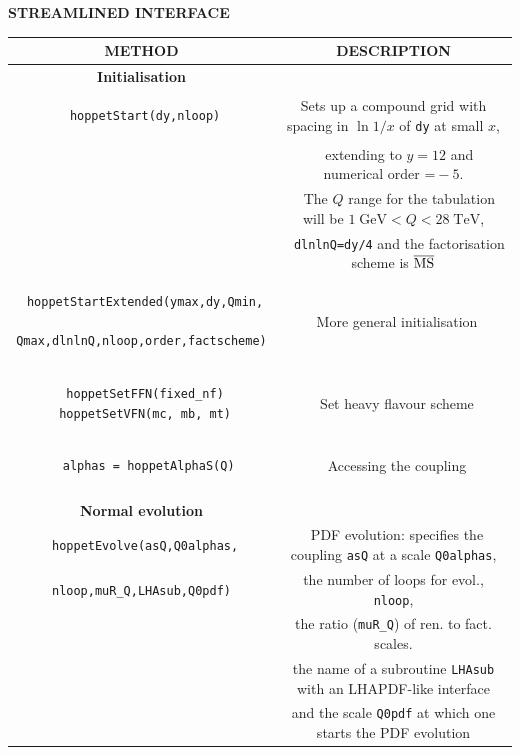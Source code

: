 \documentclass[12pt]{article}
\newcommand{\GeV}{\;\mathrm{GeV}}
\newcommand{\TeV}{\;\mathrm{TeV}}
\newcommand{\ttt}[1]{\texttt{#1}}
\newcommand{\fn}{\scriptsize}
\begin{document}
\begin{table}
\begin{center}
{\bf \large STREAMLINED INTERFACE}
\\
\vspace{0.2cm}
\begin{tabular}{|c|c|}
\hline
\bf METHOD  & \bf DESCRIPTION \\
\hline
\bf Initialisation & \\
\hline
\begin{lstlisting}
 hoppetStart(dy,nloop)
\end{lstlisting} 
& \scriptsize
Sets up a compound grid with
spacing in $\ln 1/x$ of \ttt{dy} at small $x$,\\ &
\fn~  extending to $y = 12$ and numerical
order $\ttt=-5$. \\ & \fn~  The $Q$ range for the tabulation will be $1\GeV <
Q<28 \TeV$, \\
& \fn~ \ttt{dlnlnQ=dy/4} and the factorisation scheme is ${\overline{\rm MS}}$\\
\hline
\begin{lstlisting}
 hoppetStartExtended(ymax,dy,Qmin,
 Qmax,dlnlnQ,nloop,order,factscheme)
\end{lstlisting} & \fn
  ~More general initialisation \\
\hline 
\begin{lstlisting}
 hoppetSetFFN(fixed_nf)
 hoppetSetVFN(mc, mb, mt)
\end{lstlisting} &
\fn ~Set heavy flavour scheme
\\
\hline
\begin{lstlisting}
  alphas = hoppetAlphaS(Q)
\end{lstlisting} &
\fn~Accessing the coupling \\
\hline&\\[-0.5em]
\bf Normal evolution & \\
\hline
\texttt{\footnotesize
 hoppetEvolve(asQ,Q0alphas,}
& \fn\ PDF evolution: specifies the coupling \ttt{asQ} at a 
scale \ttt{Q0alphas}, \\
 \texttt{\footnotesize nloop,muR\_Q,LHAsub,Q0pdf)}&
 \fn the number of loops for  evol., \ttt{nloop}, \\
&\fn the ratio (\ttt{muR\_Q}) of ren. to fact. scales. \\ 
&  \fn the name of a subroutine \ttt{LHAsub} with an LHAPDF-like interface \\
&  \fn and the scale
\ttt{Q0pdf} at which one starts the PDF evolution \\

\end{tabular}
\end{center}
\end{table}
\end{document}
